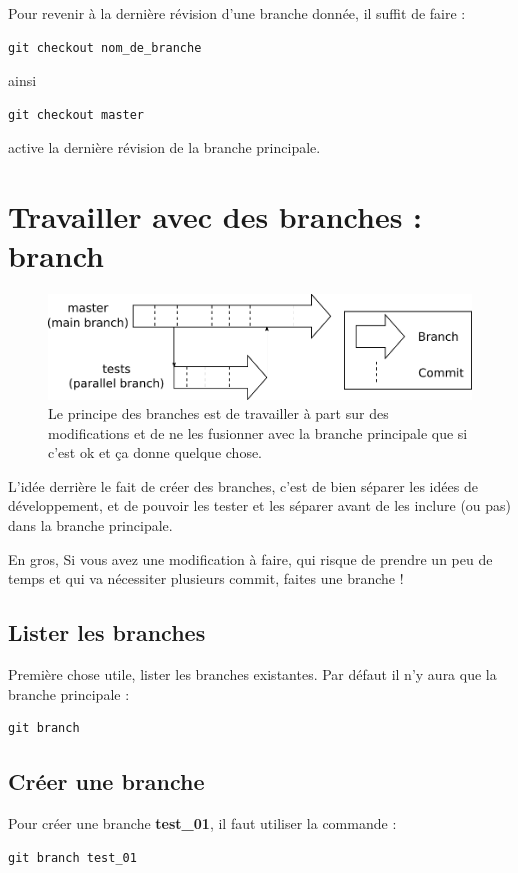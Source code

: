 \documentclass[a4paper,twoside]{article}
\begin{document}
Pour revenir à la dernière révision d'une branche donnée, il suffit de faire :
\begin{verbatim}
git checkout nom_de_branche
\end{verbatim}
ainsi
\begin{verbatim}
git checkout master
\end{verbatim}
active la dernière révision de la branche principale.



\section{Travailler avec des branches : branch}
\begin{figure}[htb]
\centering
\includegraphics[width=0.75\linewidth]{figure/branchs.pdf}
\caption{Le principe des branches est de travailler à part sur des modifications et de ne les fusionner avec la branche principale que si c'est ok et ça donne quelque chose.}
\end{figure}

L'idée derrière le fait de créer des branches, c'est de bien séparer les idées de développement, et de pouvoir les tester et les séparer avant de les inclure (ou pas) dans la branche principale. 

\begin{important}
En gros, Si vous avez une modification à faire, qui risque de prendre un peu de temps et qui va nécessiter plusieurs commit, faites une branche !
\end{important}


\subsection{Lister les branches}
Première chose utile, lister les branches existantes. Par défaut il n'y aura que la branche principale : 
\begin{verbatim}
git branch
\end{verbatim}

\subsection{Créer une branche}
Pour créer une branche \textbf{test\_01}, il faut utiliser la commande :
\begin{verbatim}
git branch test_01
\end{verbatim}
\end{document}
